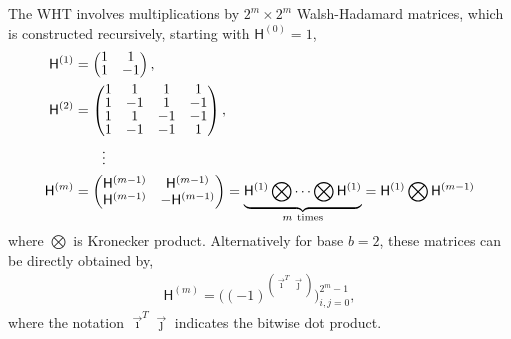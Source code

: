 \documentclass{svjour3}                     %
\newcommand{\mH}{\mathsf{H}}
\begin{document}
The WHT involves multiplications by $2^m \times 2^m$ Walsh-Hadamard matrices, which is constructed recursively, starting with $\mH^{(0)} = 1$,
\begin{align}
\nonumber
\arraycolsep=1.4pt\def\arraystretch{0.9}
\mH^{(1)} &=
\begin{pmatrix}
1 & 1 \\ 1 & -1
\end{pmatrix}, \\
\nonumber
\mH^{(2)} &= 
\begin{pmatrix}
1 & 1 & 1 & 1 \\ 
1 & -1 & 1 & -1 \\
1 & 1 & -1 & -1 \\ 
1 & -1 & -1 & 1 \\
\end{pmatrix}, \\
\nonumber
& \qquad \vdots
\\
\label{eqn:hadamard_matrix}
\mH^{(m)} &= 
\begin{pmatrix}
\mH^{(m-1)} & \mH^{(m-1)} \\ \mH^{(m-1)} & -\mH^{(m-1)}
\end{pmatrix} 
= \underbrace{\mH^{(1)} \bigotimes \cdots \bigotimes \mH^{(1)}}_{m \ \text{times}} 
= \mH^{(1)} \bigotimes \mH^{(m-1)}
\end{align}
where $\bigotimes$ is Kronecker product. Alternatively for base $b=2$, these matrices can be  directly obtained by,
\begin{align*}
\mH^{(m)} %
= \bigg((-1)^{(\vec{\imath}^T \vec{\jmath})} \bigg)_{i,j=0}^{2^m-1},
\end{align*}
where the notation $\vec{\imath}^T \vec{\jmath}$ indicates the bitwise dot product. 

\end{document}
